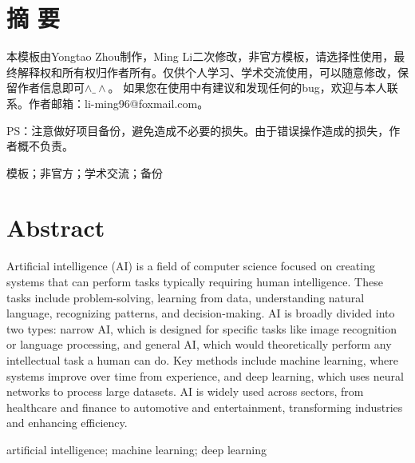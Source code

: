 \frontmatter {}  %

\chapter*{摘\texorpdfstring{\qquad}{} 要}
\thispagestyle{main}

本模板由Yongtao Zhou制作，Ming Li二次修改，非官方模板，请选择性使用，最终解释权和所有权归作者所有。仅供个人学习、学术交流使用，可以随意修改，保留作者信息即可$\wedge\_\wedge$。
如果您在使用中有建议和发现任何的bug，欢迎与本人联系。作者邮箱：\newline li-ming96@foxmail.com。

PS：注意做好项目备份，避免造成不必要的损失。由于错误操作造成的损失，作者概不负责。

\bigskip
{} 模板；非官方；学术交流；备份


\chapter*{\bfseries \sffamily Abstract}
\thispagestyle{main}

Artificial intelligence (AI) is a field of computer science focused on creating systems that can perform tasks typically requiring human intelligence. These tasks include problem-solving, learning from data, understanding natural language, recognizing patterns, and decision-making. AI is broadly divided into two types: narrow AI, which is designed for specific tasks like image recognition or language processing, and general AI, which would theoretically perform any intellectual task a human can do. Key methods include machine learning, where systems improve over time from experience, and deep learning, which uses neural networks to process large datasets. AI is widely used across sectors, from healthcare and finance to automotive and entertainment, transforming industries and enhancing efficiency.

\bigskip
{} artificial intelligence; machine learning; deep learning
